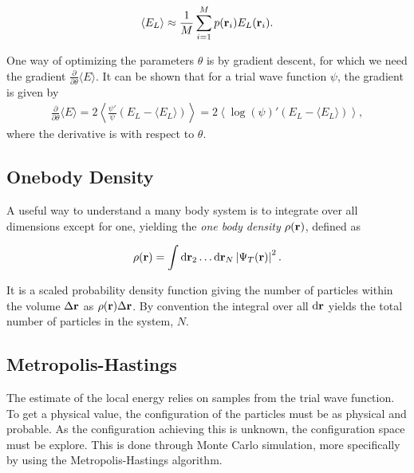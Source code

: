 \begin{align*}
  \expval{E_{L}} \approx \frac{1}{M}\sum_{i=1}^{M} p(\vb{r}_{i})E_{L}(\vb{r}_{i}).
\end{align*}

One way of optimizing the parameters \(\theta\) is by gradient descent, for which we need the gradient $\frac{\partial}{\partial \theta} \langle E \rangle$. It can be shown that for a trial wave function $\psi$, the gradient is given by  
\begin{align*}
	\frac{\partial}{\partial \theta} \langle E \rangle 
	=
	2\left\langle \frac{\psi'}{\psi}(E_L -\langle E_L \rangle)\right\rangle
	= 
	2\left\langle \log(\psi)'(E_L -\langle E_L \rangle)\right\rangle,
\end{align*}
where the derivative is with respect to \(\theta\).


\subsection{Onebody Density}

A useful way to understand a many body system is to integrate over all
dimensions except for one, yielding the \textit{one body density}
\(\rho(\vb{r})\), defined as

\begin{align*}
  \rho( \vb{r} ) = \int \dd \mathbf{r}_{2} \ldots \dd \mathbf{r}_{N} \left| \Psi_T(\vb{r}) \right|^{2}.
\end{align*}

It is a scaled probability density function giving the number of particles
within the volume \(\Delta \vb{r}\) as \(\rho(\vb{r})\Delta \vb{r}\).
By convention the integral over all \(\dd \vb{r}\) yields the total number of
particles in the system, \(N\).


\subsection{Metropolis-Hastings}

The estimate of the local energy relies on samples from the trial wave function.
To get a physical value, the configuration of the particles must be as physical
and probable. As the configuration achieving this is unknown, the configuration
space must be explore. This is done through Monte Carlo simulation, more
specifically by using the Metropolis-Hastings algorithm.

